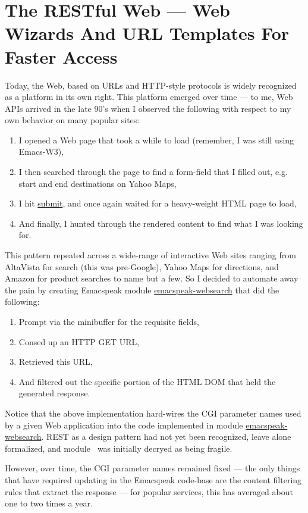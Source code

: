 \documentclass[11pt]{article}
\begin{document}
\section{The RESTful Web —  Web Wizards And URL Templates For Faster Access}
\label{sec-14}

Today, the Web, based on URLs and HTTP-style protocols is widely
recognized as a platform in its own right. This platform emerged
over time — to me, Web APIs arrived in the late 90's when I
observed the following with respect to my own behavior on many
popular sites:

\begin{enumerate}
\item I opened a Web page that took a while to load (remember,  I
was still using Emacs-W3),
\item I then searched through the page to find a form-field that
I filled out, e.g. start and end destinations on Yahoo Maps,
\item I hit \uline{submit}, and once again waited for a heavy-weight
HTML page to load,
\item And finally, I hunted through the rendered content to find
what I was looking for.
\end{enumerate}

This pattern repeated across a wide-range of interactive Web
sites ranging from AltaVista for search (this was pre-Google),
Yahoo Maps for directions, and Amazon for product searches to
name but a few. So I decided to automate away the pain by
creating Emacspeak module \uline{emacspeak-websearch} that did the
following:

\begin{enumerate}
\item Prompt via the minibuffer for the requisite fields,
\item Consed up an HTTP GET URL,
\item Retrieved this URL,
\item And filtered out the specific portion of the HTML  DOM that
held the generated response.
\end{enumerate}

Notice that the above implementation hard-wires the CGI parameter
names used by a given Web application into the code implemented
in module \uline{emacspeak-websearch}. REST as a design pattern had not
yet been recognized, leave alone formalized, and module
$_{\text{ }}$was initially decryed as being fragile.

However, over time, the CGI parameter names remained fixed — the
 only things that have required updating in the Emacspeak
 code-base are the content filtering rules that extract the
 response — for popular services, this has averaged about one to
 two times a year.
\end{document}
